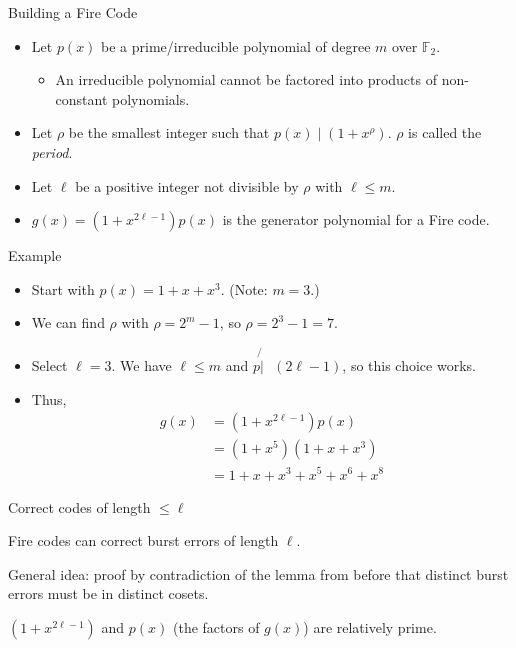 \documentclass[aspectratio=169]{beamer}
\begin{document}
\begin{frame}{Building a Fire Code}
    \begin{itemize}
        \item Let $p(x)$ be a prime/irreducible polynomial of degree $m$ over $\mathbb{F}_2$.
        \begin{itemize}
            \item An irreducible polynomial cannot be factored into products of non-constant polynomials.
        \end{itemize}
        \pause
        \item Let $\rho$ be the smallest integer such that $p(x) \mid (1 + x^\rho)$. $\rho$ is called the \textit{period}.
        \pause
        \item Let $\ell$ be a positive integer not divisible by $\rho$ with $\ell \le m$.
        \pause
        \item $g(x) = (1 + x^{2\ell - 1})p(x)$ is the generator polynomial for a Fire code.
    \end{itemize}
\end{frame}

\begin{frame}{Example}
    \begin{itemize}
        \item Start with $p(x) = 1 + x + x^3$. (Note: $m = 3$.)
        \pause
        \item We can find $\rho$ with $\rho = 2^m - 1$, so $\rho = 2^3 - 1 = 7$.
        \pause
        \item Select $\ell = 3$. We have $\ell \le m$ and $p \not{\vert} \text{ } (2 \ell - 1)$, so this choice works.
        \pause
        \item Thus,
        \begin{align*}
            g(x)
            & = (1 + x^{2\ell - 1})p(x) \\
            & = (1 + x^5)(1 + x + x^3) \\
            & = 1 + x + x^3 + x^5 + x^6 + x^8
        \end{align*}
    \end{itemize}
\end{frame}

\begin{frame}{Correct codes of length $\le \ell$}
    \begin{thrm}
        Fire codes can correct burst errors of length $\ell$.
    \end{thrm}
    \begin{pf}
        General idea: proof by contradiction of the lemma from before that distinct burst errors must be in distinct cosets.
        \begin{lem}
            $(1 + x^{2\ell - 1})$ and  $p(x)$ (the factors of $g(x)$) are relatively prime.
        \end{lem}
    \end{pf}
\end{frame}
\end{document}
